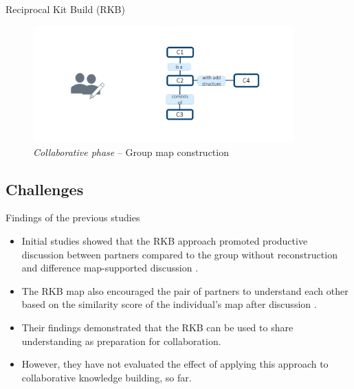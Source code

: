 \begin{frame}[allowframebreaks]{Reciprocal Kit Build (RKB)}
    \begin{figure}[tb]
        \begin{center}
            \includegraphics[width=100mm]{images/RKB_p4.pdf}
        \end{center}
        \caption{\emph{Collaborative phase} -- Group map construction}
        \label{intro::rkb_p4}
    \end{figure}
    
 
\end{frame}


\subsection{Challenges}

\begin{frame}{Findings of the previous studies}
    \begin{itemize}
        \item Initial studies showed that the RKB approach promoted productive
        discussion between partners compared to the group without reconstruction
        and difference map-supported discussion
        \cite{Wunnasri2018ReciprocalUnderstanding}. 
        \item The RKB map also encouraged the pair of partners to understand each other based on the similarity
        score of the individual's map after discussion
        \cite{Wunnasri2018ReciprocalCollaboration}. 
        \item Their findings demonstrated that the RKB can be used to share understanding as preparation for
        collaboration. 
        \item However, they have not evaluated the effect of applying
        this approach to collaborative knowledge building, so far. 
        
    \end{itemize}
\end{frame}

